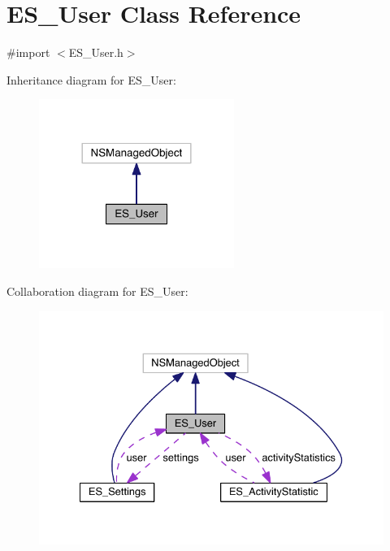 \hypertarget{interface_e_s___user}{\section{E\+S\+\_\+\+User Class Reference}
\label{interface_e_s___user}
}


{\ttfamily \#import $<$E\+S\+\_\+\+User.\+h$>$}



Inheritance diagram for E\+S\+\_\+\+User\+:\nopagebreak
\begin{figure}[H]
\begin{center}
\leavevmode
\includegraphics[width=180pt]{dd/d12/interface_e_s___user__inherit__graph}
\end{center}
\end{figure}


Collaboration diagram for E\+S\+\_\+\+User\+:\nopagebreak
\begin{figure}[H]
\begin{center}
\leavevmode
\includegraphics[width=330pt]{d7/dbe/interface_e_s___user__coll__graph}
\end{center}
\end{figure}
